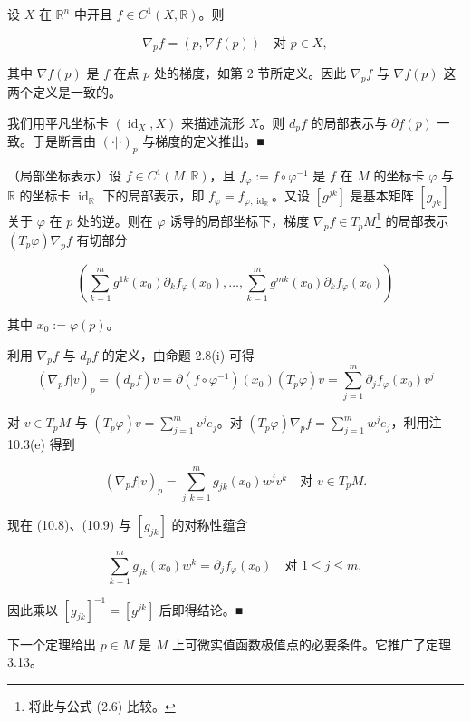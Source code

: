 \begin{remark}

\begin{items}
\item

设 $ X $ 在 $ \mathbb{R}^{n} $ 中开且 $ f \in C^{1}(X,\mathbb{R}) $。则

\[
\nabla_{p}f = (p, \nabla f(p)) \quad \text{对 } p \in X ,
\]

其中 $ \nabla f(p) $ 是 $ f $ 在点 $ p $ 处的梯度，如第 2 节所定义。因此 $ \nabla_{p}f $ 与 $ \nabla f(p) $ 这两个定义是一致的。

\proofhead
我们用平凡坐标卡 $ (\operatorname{id}_{X}, X) $ 来描述流形 $ X $。则 $ d_{p}f $ 的局部表示与 $ \partial f(p) $ 一致。于是断言由 $ (\cdot|\cdot)_{p} $ 与梯度的定义推出。\nobreak\hspace{0.35em}■
\item

（局部坐标表示）设 $ f \in C^{1}(M,\mathbb{R}) $，且 $ f_{\varphi} := f\circ\varphi^{-1} $ 是 $ f $ 在 $ M $ 的坐标卡 $ \varphi $ 与 $ \mathbb{R} $ 的坐标卡 $ \operatorname{id}_{\mathbb{R}} $ 下的局部表示，即 $ f_{\varphi} = f_{\varphi,\operatorname{id}_{\mathbb{R}}} $。又设 $ [g^{jk}] $ 是基本矩阵 $ [g_{jk}] $ 关于 $ \varphi $ 在 $ p $ 处的逆。则在 $ \varphi $ 诱导的局部坐标下，梯度 $ \nabla_{p}f \in T_{p}M $\footnote{将此与公式 (2.6) 比较。} 的局部表示 $ (T_{p}\varphi)\nabla_{p}f $ 有切部分

\[
\left(\sum_{k=1}^{m}g^{1k}(x_{0})\partial_{k}f_{\varphi}(x_{0}), \ldots, \sum_{k=1}^{m}g^{mk}(x_{0})\partial_{k}f_{\varphi}(x_{0})\right)
\]

其中 $ x_{0} := \varphi(p) $。

\proofhead
利用 $ \nabla_{p}f $ 与 $ d_{p}f $ 的定义，由命题 2.8(i) 可得
\begin{equation}
(\nabla_{p}f|v)_{p} = (d_{p}f)v = \partial(f\circ\varphi^{-1})(x_{0})(T_{p}\varphi)v = \sum_{j=1}^{m}\partial_{j}f_{\varphi}(x_{0})v^{j}\tag{10.8}
\end{equation}

对 $ v \in T_{p}M $ 与 $ (T_{p}\varphi)v = \sum_{j=1}^{m}v^{j}e_{j} $。对 $ (T_{p}\varphi)\nabla_{p}f = \sum_{j=1}^{m}w^{j}e_{j} $，利用注 10.3(e) 得到

\begin{equation}
(\nabla_{p}f|v)_{p} = \sum_{j,k=1}^{m}g_{jk}(x_{0})w^{j}v^{k} \quad \text{对 } v \in T_{p}M .\tag{10.9}
\end{equation}

现在 (10.8)、(10.9) 与 $ [g_{jk}] $ 的对称性蕴含

\[
\sum_{k=1}^{m}g_{jk}(x_{0})w^{k} = \partial_{j}f_{\varphi}(x_{0}) \quad \text{对 } 1 \le j \le m ,
\]

因此乘以 $ [g_{jk}]^{-1} = [g^{jk}] $ 后即得结论。\nobreak\hspace{0.35em}■

\end{items}

下一个定理给出 $ p \in M $ 是 $ M $ 上可微实值函数极值点的必要条件。它推广了定理 3.13。

\end{remark}


